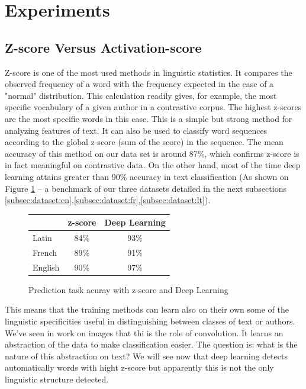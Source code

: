 \section{Experiments}
\label{sec:experiments}

\subsection{Z-score Versus Activation-score}

Z-score is one of the most used methods in linguistic statistics. It compares the observed frequency of a word with the frequency expected in the case of a "normal" distribution. This calculation readily gives, for example, the most specific vocabulary of a given author in a contrastive corpus. The highest z-scores are the most specific words in this case. This is a simple but strong method for analyzing features of text. It can also be used to classify word sequences according to the global z-score (sum of the score) in the sequence. The mean accuracy of this method on our data set is around 87\%, which confirms z-score is in fact meaningful on contrastive data. On the other hand, most of the time deep learning attains greater than 90\% accuracy in text classification (As shown on Figure \ref{benchmark} -- a benchmark of our three datasets detailed in the next subsections \ref{subsec:dataset:en},\ref{subsec:dataset:fr},\ref{subsec:dataset:lt}). 

\begin{figure}
\begin{center}
\begin{tabular}{|l|c|c|}
  \hline
  ~ & z-score & Deep Learning \\
  \hline
  Latin & 84\% & 93\% \\
  French & 89\% & 91\% \\
  English & 90\% & 97\% \\
  \hline
\end{tabular}
\caption{Prediction task acuray with z-score and Deep Learning}
\label{benchmark}
\end{center}
\end{figure}

This means that the training methods can learn also on their own some of the linguistic specificities useful in distinguishing between classes of text or authors. We've seen in work on images that thi is the role of convolution. It learns an abstraction of the data to make classification easier. The question is: what is the nature of this abstraction on text? We will see now that deep learning detects automatically words with hight z-score but apparently this is not the only linguistic structure detected.

